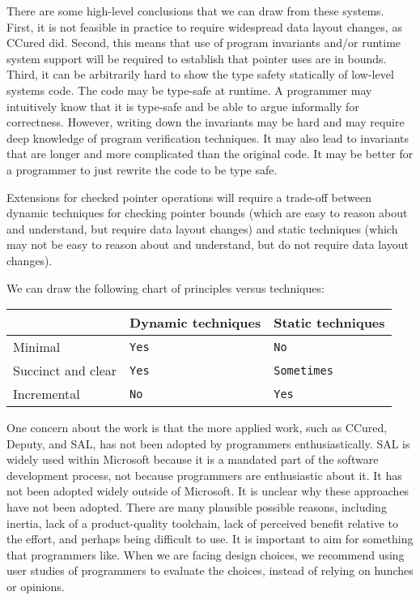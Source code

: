 There are some high-level conclusions that we can draw from these
systems. First, it is not feasible in practice to require widespread
data layout changes, as CCured did. Second, this means that use of
program invariants and/or runtime system support will be required to
establish that pointer uses are in bounds. Third, it can be arbitrarily
hard to show the type safety statically of low-level systems
code. The code may be type-safe at runtime. A programmer may intuitively know
that it is type-safe and be able to argue informally for correctness.
However, writing down the invariants may be hard and may require deep
knowledge of program verification techniques. It may also lead to
invariants that are longer and more complicated than the original code.
It may be better for a programmer to just rewrite the code to be type
safe.

Extensions for checked pointer operations will require a trade-off between
dynamic techniques for checking pointer bounds (which are easy to reason
about and understand, but require data layout changes) and static
techniques (which may not be easy to reason about and understand, but do
not require data layout changes).

We can draw the following chart of principles versus techniques:

\begin{longtable}[c]{@{}lll@{}}
\toprule
& Dynamic techniques & Static techniques\tabularnewline
\midrule
\endhead
Minimal & \texttt{Yes} & \texttt{No}\tabularnewline
Succinct and clear & \texttt{Yes} & \texttt{Sometimes}\tabularnewline
Incremental & \texttt{No} & \texttt{Yes}\tabularnewline
\bottomrule
\end{longtable}

One concern about the work is that the more applied work, such as
CCured, Deputy, and SAL, has not been adopted by programmers
enthusiastically. SAL is widely used within Microsoft because it is a
mandated part of the software development process, not because
programmers are enthusiastic about it. It has not been adopted widely
outside of Microsoft. It is unclear why these approaches have not been
adopted. There are many plausible possible reasons, including inertia,
lack of a product-quality toolchain, lack of perceived benefit relative
to the effort, and perhaps being difficult to use. It is important to
aim for something that programmers like. When we are facing design
choices, we recommend using user studies of programmers to evaluate the
choices, instead of relying on hunches or opinions.

